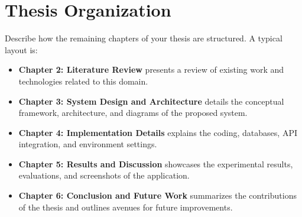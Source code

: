 \section{Thesis Organization}
Describe how the remaining chapters of your thesis are structured. A typical layout is:
\begin{itemize}
    \item \textbf{Chapter 2: Literature Review} presents a review of existing work and technologies related to this domain.
    \item \textbf{Chapter 3: System Design and Architecture} details the conceptual framework, architecture, and diagrams of the proposed system.
    \item \textbf{Chapter 4: Implementation Details} explains the coding, databases, API integration, and environment settings.
    \item \textbf{Chapter 5: Results and Discussion} showcases the experimental results, evaluations, and screenshots of the application.
    \item \textbf{Chapter 6: Conclusion and Future Work} summarizes the contributions of the thesis and outlines avenues for future improvements.
\end{itemize}

